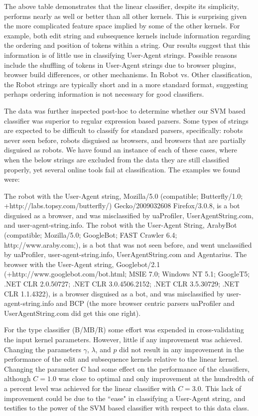 \documentclass[10pt]{article}
\begin{document}
\begin{multicols}{2}
The above table demonstrates that the linear classifier, despite its simplicity, performs nearly as well or better than all other kernels.  This is surprising given the more complicated feature space implied by some of the other kernels.  For example, both edit string and subsequence kernels include information regarding the ordering and position of tokens within a string.  Our results suggest that this information is of little use in classifying User-Agent strings.  Possible reasons include the shuffling of tokens in User-Agent strings due to browser plugins, browser build differences, or other mechanisms.  In Robot vs. Other classification, the Robot strings are typically short and in a more standard format, suggesting perhaps ordering information is not necessary for good classifiers.  

The data was further inspected post-hoc to determine whether our SVM based classifier was superior to regular expression based parsers.  Some types of strings are expected to be difficult to classify for standard parsers, specifically: robots never seen before, robots disguised as browsers, and browsers that are partially disguised as robots.  We have found an instance of each of these cases, where when the below strings are excluded from the data they are still classified properly, yet several online tools fail at classification.  The examples we found were: 

The robot with the User-Agent string, Mozilla/5.0 (compatible; Butterfly/1.0; \\+http://labs.topsy.com/butterfly/) Gecko/2009032608 Firefox/3.0.8, is a bot disguised as a browser, and was misclassified by uaProfiler, UserAgentString.com, and user-agent-string.info. 
The robot with the User-Agent String,  ArabyBot (compatible; Mozilla/5.0; GoogleBot; FAST Crawler 6.4; http://www.araby.com;), is a bot that was not seen before, and went unclassified by uaProfiler, user-agent-string.info, UserAgentString.com and Agentarius.  
The browser with the User-Agent string, Googlebot/2.1 (+http://www.googlebot.com/bot.html; MSIE 7.0; Windows NT 5.1; GoogleT5; .NET CLR 2.0.50727; .NET CLR 3.0.4506.2152; .NET CLR 3.5.30729; .NET CLR 1.1.4322), is a browser disguised as a bot, and was misclassified by user-agent-string.info and BCP (the more browser centric parsers uaProfiler and UserAgentString.com did get this one right).  

For the type classifier (B/MB/R) some effort was expended in cross-validating the input kernel parameters.  However, little if any improvement was achieved.  Changing the parameters $\gamma$, $\lambda$, and $p$ did not result in any improvement in the performance of the edit and subsequence kernels relative to the linear kernel.  Changing the parameter C had some effect on the performance of the classifiers, although $C = 1.0$ was close to optimal and only improvement at the hundredth of a percent level was achieved for the linear classifier with $C = 3.0$.  This lack of improvement could be due to the ``ease" in classifying a User-Agent string, and testifies to the power of the SVM based classifier with respect to this data class.


\end{multicols}
\end{document}
